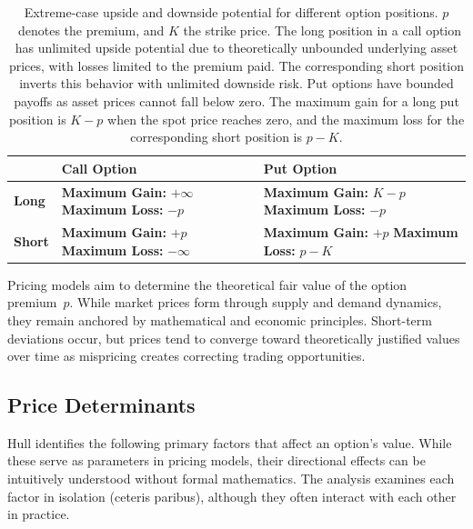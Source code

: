 \documentclass[english,12pt,a4paper,pdftex,sci,utf8]{aaltothesis}
\begin{document}
\begin{table}[!htb]
\centering
\caption{Extreme-case upside and downside potential for different option positions. \mbox{$p$ denotes} the premium, and $K$ the strike price. The long position in a call option has unlimited upside potential due to theoretically unbounded underlying asset prices, with losses limited to the premium paid. The corresponding short position inverts this behavior with unlimited downside risk. Put options have bounded payoffs as asset prices cannot fall below zero. The maximum gain for a long put position is $K-p$ when the spot price reaches zero, and the maximum loss for the corresponding short position is $p-K$.}\label{tab:options_table}
\begin{tabular}{|l|p{5cm}|p{5cm}|}
\hline
\textbf{} & \textbf{Call Option} & \textbf{Put Option} \\
\hline
\textbf{Long} & \textbf{Maximum Gain:} $+\infty$
\newline \textbf{Maximum Loss:} $-p$ & \textbf{Maximum Gain:} $K-p$
\newline \textbf{Maximum Loss:} $-p$ \\
\hline
\textbf{Short} & \textbf{Maximum Gain:} $+p$
\newline \textbf{Maximum Loss:} $-\infty$ & \textbf{Maximum Gain:} $+p$
\newline \textbf{Maximum Loss:} $p-K$ \\
\hline
\end{tabular}
\end{table}
Pricing models aim to determine the theoretical fair value of the option \mbox{premium $p$.} While market prices form through supply and demand dynamics, they remain anchored by mathematical and economic principles. Short-term deviations occur, but prices tend to converge toward theoretically justified values over time as mispricing creates correcting trading opportunities.

\subsection{Price Determinants}

Hull \cite{hull2018} identifies the following primary factors that affect an option's value. While these serve as parameters in pricing models, their directional effects can be intuitively understood without formal mathematics. The analysis examines each factor in isolation (ceteris paribus), although they often interact with each other in practice.
\end{document}
